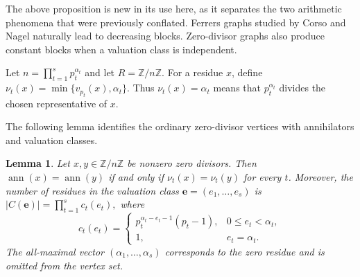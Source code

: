 \documentclass[12pt]{article}
\newtheorem{lemma}[theorem]{Lemma}
\theoremstyle{definition}
\begin{document}
\medskip

The above proposition is new in its use here, as it separates the two arithmetic phenomena that were previously conflated.  Ferrers graphs studied by Corso and Nagel \cite{CorsoNagel2009,CorsoNagel2008} naturally lead to decreasing blocks. Zero-divisor graphs also produce constant blocks when a valuation class is independent.

\medskip


Let $n=\prod_{t=1}^s p_t^{\alpha_t}$ and let $R=\mathbb{Z}/n\mathbb{Z}$.  For a residue $x$, define
$ \nu_t(x)=\min\{v_{p_t}(x),\alpha_t\}. $
Thus $\nu_t(x)=\alpha_t$ means that $p_t^{\alpha_t}$ divides the chosen representative of $x$.

\medskip

\noindent The following lemma identifies the ordinary zero-divisor vertices with  annihilators  and valuation classes.
\begin{lemma}\label{lem:valuation-annihilator}
	Let $x,y\in \mathbb{Z}/n\mathbb{Z}$ be nonzero zero divisors.  Then $\operatorname{ann}(x)=\operatorname{ann}(y)$ if and only if $\nu_t(x)=\nu_t(y)$ for every $t$.  Moreover, the number of residues in the valuation class $\mathbf e=(e_1,\ldots,e_s)$ is $|C(\mathbf e)|=\prod_{t=1}^s c_t(e_t),$ where
	$$
	 c_t(e_t)=
	\begin{cases}
		p_t^{\alpha_t-e_t-1}(p_t-1),&0\leq e_t<\alpha_t,\\
		1,&e_t=\alpha_t.
	\end{cases}
	$$
	The all-maximal vector $(\alpha_1,\ldots,\alpha_s)$ corresponds to the zero residue and is omitted from the vertex set.
\end{lemma}
\end{document}
